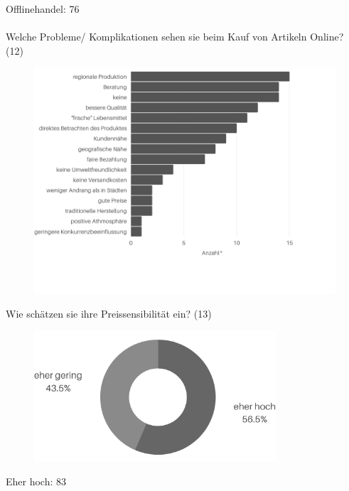 Offlinehandel: 76\\\\
\fi
\newpage\noindent Welche Probleme/ Komplikationen sehen sie beim Kauf von Artikeln Online? (12)
\begin{figure}[H]
    \begin{center}
        \includegraphics[width=17cm]{media/schuelerumfrage/12.png}
    \end{center}
\end{figure}

\noindent Wie schätzen sie ihre Preissensibilität ein? (13)\\
 
\begin{figure}[H]
    \begin{center}
        \includegraphics[width=9cm]{media/schuelerumfrage/13.png}
    \end{center}
\end{figure} 
\iffalse
Eher hoch: 83

